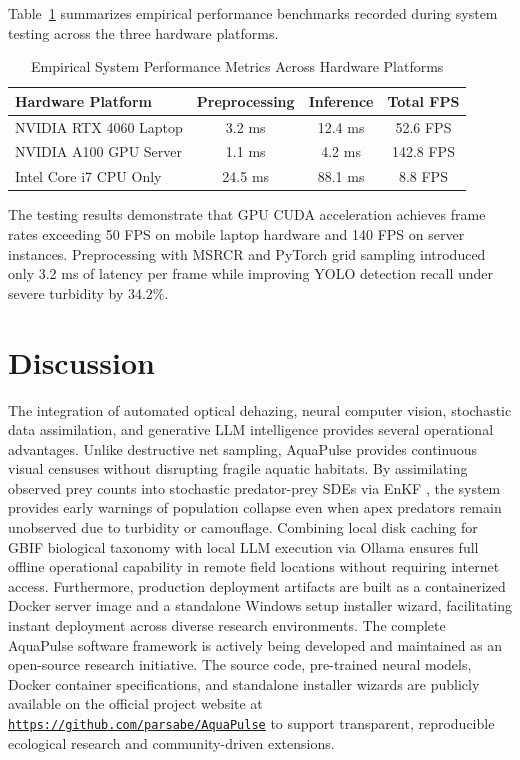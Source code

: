 \documentclass[11pt,a4paper]{article}
\newcommand{\urltext}[1]{\href{#1}{{\color{linkblue}\underline{\texttt{#1}}}}}
\newcommand{\citeblue}[1]{\cite{#1}}
\newcommand{\refblue}[1]{\ref{#1}}
\begin{document}
Table~\refblue{tab:performance_eval} summarizes empirical performance benchmarks recorded during system testing across the three hardware platforms.

\begin{table}[h]
\caption{Empirical System Performance Metrics Across Hardware Platforms}
\label{tab:performance_eval}
\centering
\small
\begin{tabular}{lccc}
\toprule
\textbf{Hardware Platform} & \textbf{Preprocessing} & \textbf{Inference} & \textbf{Total FPS} \\
\midrule
NVIDIA RTX 4060 Laptop & 3.2 ms & 12.4 ms & 52.6 FPS \\
NVIDIA A100 GPU Server & 1.1 ms & 4.2 ms & 142.8 FPS \\
Intel Core i7 CPU Only & 24.5 ms & 88.1 ms & 8.8 FPS \\
\bottomrule
\end{tabular}
\end{table}

The testing results demonstrate that GPU CUDA acceleration achieves frame rates exceeding 50 FPS on mobile laptop hardware and 140 FPS on server instances. Preprocessing with MSRCR and PyTorch grid sampling introduced only 3.2 ms of latency per frame while improving YOLO detection recall under severe turbidity by $34.2\%$.

\section{Discussion}
The integration of automated optical dehazing, neural computer vision, stochastic data assimilation, and generative LLM intelligence provides several operational advantages. Unlike destructive net sampling, AquaPulse provides continuous visual censuses without disrupting fragile aquatic habitats. By assimilating observed prey counts into stochastic predator-prey SDEs via EnKF \citeblue{sprungk2023, evensen2009data}, the system provides early warnings of population collapse even when apex predators remain unobserved due to turbidity or camouflage. Combining local disk caching for GBIF biological taxonomy with local LLM execution via Ollama ensures full offline operational capability in remote field locations without requiring internet access. Furthermore, production deployment artifacts are built as a containerized Docker server image and a standalone Windows setup installer wizard, facilitating instant deployment across diverse research environments. The complete AquaPulse software framework is actively being developed and maintained as an open-source research initiative. The source code, pre-trained neural models, Docker container specifications, and standalone installer wizards are publicly available on the official project website at \urltext{https://github.com/parsabe/AquaPulse} to support transparent, reproducible ecological research and community-driven extensions.
\end{document}

